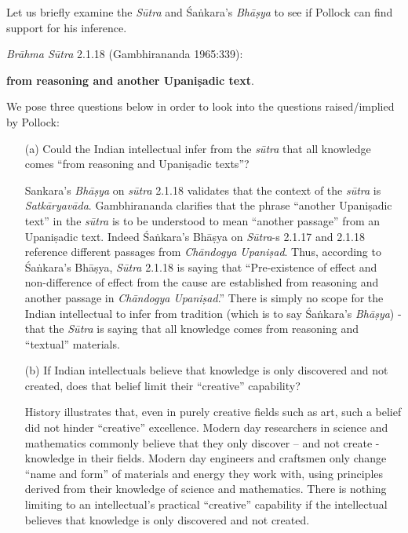 Let us briefly examine the {\sl Sūtra} and Śaṅkara's {\sl Bhāṣya} to see if Pollock can find support for his inference.

{\sl Brāhma Sūtra} 2.1.18 (Gambhirananda 1965:339):
\begin{myquote}
 \textbf{from reasoning and another Upaniṣadic text}.
\end{myquote}

We pose three questions below in order to look into the questions raised/implied by Pollock:
\begin{itemize}
\item[(a)] Could the Indian intellectual infer from the {{\sl sūtra}\relax} that all knowledge comes ``from reasoning and Upaniṣadic texts''?

Sankara's {\sl Bhāṣya} on {\sl sūtra} 2.1.18 validates that the context of the {\sl sūtra} is {\sl Satkāryavāda}.  Gambhirananda clarifies that the phrase ``another Upaniṣadic text'' in the {\sl sūtra} is to be understood to mean ``another passage'' from an Upaniṣadic text. Indeed Śaṅkara's Bhāṣya on {\sl Sūtra}-s 2.1.17 and 2.1.18 reference different passages from {\sl Chāndogya Upaniṣad}. Thus, according to Śaṅkara's Bhāṣya, {\sl Sūtra} 2.1.18 is saying that ``Pre-existence of effect and non-difference of effect from the cause are established from reasoning and another passage in {\sl Chāndogya Upaniṣad}.''  There is simply no scope for the Indian intellectual to infer from tradition (which is to say Śaṅkara's {\sl Bhāṣya}) - that the {\sl Sūtra} is saying that all knowledge comes from reasoning and ``textual'' materials.

\item[(b)] If Indian intellectuals believe that knowledge is only discovered and not created, does that belief limit their ``creative'' capability?

History illustrates that, even in purely creative fields such as art, such a belief did not hinder ``creative'' excellence.  Modern day researchers in science and mathematics commonly believe that they only discover -- and not create - knowledge in their fields.  Modern day engineers and craftsmen only change ``name and form'' of materials and energy they work with, using principles derived from their knowledge of science and mathematics. There is nothing limiting to an intellectual's practical ``creative'' capability if the intellectual believes that knowledge is only discovered and not created.


\end{itemize}
